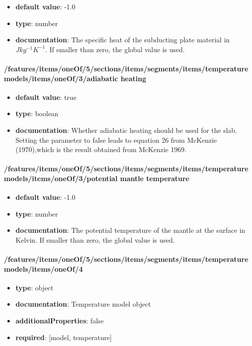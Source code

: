 \begin{itemize}\item {\bf default value}: -1.0
\item {\bf type}: number
\item {\bf documentation}: The specific heat of the subducting plate material in $J kg^{-1} K^{-1}$. If smaller than zero, the global value is used.
\end{itemize}\paragraph{/features/items/oneOf/5/sections/items/segments/items/temperature models/items/oneOf/3/adiabatic heating}
\begin{itemize}\item {\bf default value}: true
\item {\bf type}: boolean
\item {\bf documentation}: Whether adiabatic heating should be used for the slab. Setting the parameter to false leads to equation 26 from McKenzie (1970),which is the result obtained from McKenzie 1969.
\end{itemize}\paragraph{/features/items/oneOf/5/sections/items/segments/items/temperature models/items/oneOf/3/potential mantle temperature}
\begin{itemize}\item {\bf default value}: -1.0
\item {\bf type}: number
\item {\bf documentation}: The potential temperature of the mantle at the surface in Kelvin. If smaller than zero, the global value is used.
\end{itemize}\paragraph{/features/items/oneOf/5/sections/items/segments/items/temperature models/items/oneOf/4}
\begin{itemize}\item {\bf type}: object
\item {\bf documentation}: Temperature model object
\item {\bf additionalProperties}: false
\item {\bf required}: [model, temperature]\end{itemize}
